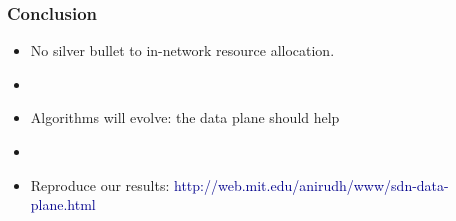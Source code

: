 \begin{Large}
\begin{frame}[plain]
\frametitle{Conclusion}
\begin{itemize}

\item No silver bullet to in-network resource allocation.

\item[]
\item Algorithms will evolve: the data plane should help

\item[]
\item Reproduce our results: \textcolor{DarkBlue}{http://web.mit.edu/anirudh/www/sdn-data-plane.html} 

\end{itemize}
\end{frame}



\end{Large}
